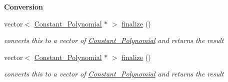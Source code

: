 \begin{Indent}\textbf{ Conversion}\par
\begin{DoxyCompactItemize}
\item 
\mbox{\label{group___g_b_computation_a6f70b5f5779e7aa262d454b9f2bbd2d1}} 
vector$<$ \hyperlink{group__polygroup_class_constant___polynomial}{Constant\+\_\+\+Polynomial} $\ast$ $>$ \hyperlink{group___g_b_computation_a6f70b5f5779e7aa262d454b9f2bbd2d1}{finalize} ()
\begin{DoxyCompactList}\small\item\em converts {\ttfamily this} to a vector of \hyperlink{group__polygroup_class_constant___polynomial}{Constant\+\_\+\+Polynomial} and returns the result \end{DoxyCompactList}\item 
\mbox{\label{group___g_b_computation_acb8721524d3d30e98fe153ed08c21232}} 
vector$<$ \hyperlink{group__polygroup_class_constant___polynomial}{Constant\+\_\+\+Polynomial} $\ast$ $>$ \hyperlink{group___g_b_computation_acb8721524d3d30e98fe153ed08c21232}{finalize} ()
\begin{DoxyCompactList}\small\item\em converts {\ttfamily this} to a vector of \hyperlink{group__polygroup_class_constant___polynomial}{Constant\+\_\+\+Polynomial} and returns the result \end{DoxyCompactList}\end{DoxyCompactItemize}
\end{Indent}

